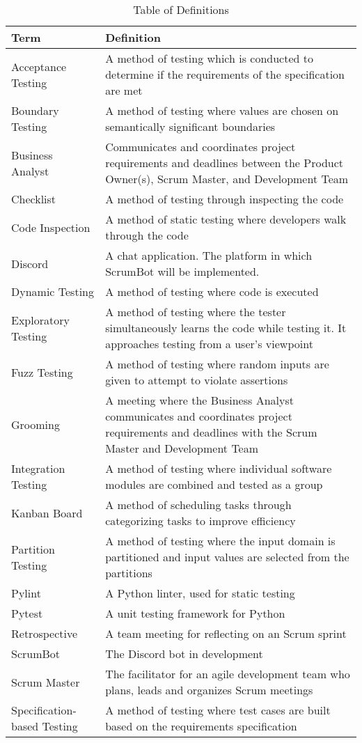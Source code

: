 \documentclass[12pt, titlepage]{article}
\begin{document}
\begin{table}[H]
    \caption{Table of Definitions}
    \label{Table}
    \begin{tabularx}{\textwidth}{p{4cm}X}
        \toprule
        \textbf{Term} & \textbf{Definition}\\
        \midrule
        Acceptance Testing & A method of testing which is conducted to determine if the requirements of the specification are met\\
        Boundary Testing & A method of testing where values are chosen on semantically significant boundaries\\
        Business Analyst & Communicates and coordinates project requirements and deadlines between the Product Owner(s), Scrum Master, and Development Team\\
        Checklist & A method of testing through inspecting the code\\
        Code Inspection & A method of static testing where developers walk through the code\\
        Discord & A chat application. The platform in which ScrumBot will be implemented.\\
        Dynamic Testing & A method of testing where code is executed\\
        Exploratory Testing & A method of testing where the tester simultaneously learns the code while testing it. It approaches testing from a user's viewpoint\\
        Fuzz Testing & A method of testing where random inputs are given to attempt to violate assertions\\
        Grooming & A meeting where the Business Analyst communicates and coordinates project requirements and deadlines with the Scrum Master and Development Team\\
        Integration Testing & A method of testing where individual software modules are combined and tested as a group\\
        Kanban Board & A method of scheduling tasks through categorizing tasks to improve efficiency\\
        Partition Testing & A method of testing where the input domain is partitioned and input values are selected from the partitions\\
        Pylint & A Python linter, used for static testing\\
        Pytest & A unit testing framework for Python\\
        Retrospective & A team meeting for reflecting on an Scrum sprint\\
        ScrumBot & The Discord bot in development\\
        Scrum Master & The facilitator for an agile development team who plans, leads and organizes Scrum meetings\\
        Specification-based Testing & A method of testing where test cases are built based on the requirements specification\\
        \bottomrule
    \end{tabularx}
\end{table}	
\end{document}
